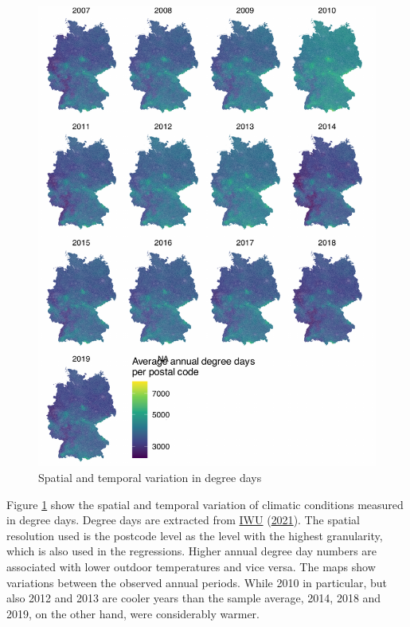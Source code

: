 \documentclass[12pt,twoside]{reedthesis}
\begin{document}
\newpage
\begin{figure}

{\centering \includegraphics[width=0.77\linewidth]{figure/distribution_degree_days} 

}

\caption{Spatial and temporal variation in degree days}\label{fig:degree-days-distribution}
\end{figure}
\noindent
Figure \ref{fig:degree-days-distribution} show the spatial and temporal variation of climatic conditions measured in degree days. Degree days are extracted from \protect\hyperlink{ref-iwu21}{IWU} (\protect\hyperlink{ref-iwu21}{2021}). The spatial resolution used is the postcode level as the level with the highest granularity, which is also used in the regressions. Higher annual degree day numbers are associated with lower outdoor temperatures and vice versa. The maps show variations between the observed annual periods. While 2010 in particular, but also 2012 and 2013 are cooler years than the sample average, 2014, 2018 and 2019, on the other hand, were considerably warmer.
\end{document}
